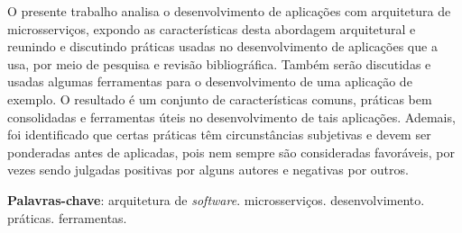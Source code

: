 \setlength{\absparsep}{18pt} %
\begin{resumo}

O presente trabalho analisa o desenvolvimento de aplicações com arquitetura de microsserviços, expondo as características desta abordagem arquitetural e reunindo e discutindo práticas usadas no desenvolvimento de aplicações que a usa, por meio de pesquisa e revisão bibliográfica. Também serão discutidas e usadas algumas ferramentas para o desenvolvimento de uma aplicação de exemplo. O resultado é um conjunto de características comuns, práticas bem consolidadas e ferramentas úteis no desenvolvimento de tais aplicações. Ademais, foi identificado que certas práticas têm circunstâncias subjetivas e devem ser ponderadas antes de aplicadas, pois nem sempre são consideradas favoráveis, por vezes sendo julgadas positivas por alguns autores e negativas por outros.



 \textbf{Palavras-chave}: arquitetura de \emph{software}. microsserviços. desenvolvimento. práticas. ferramentas.
\end{resumo}